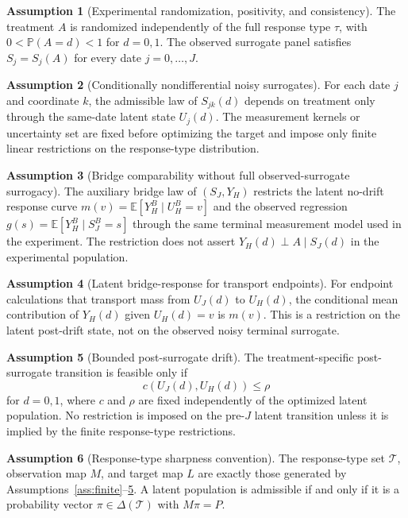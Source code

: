 \documentclass[11pt]{article}
\newcommand{\E}{\mathbb{E}}
\renewcommand{\Pr}{\mathbb{P}}
\theoremstyle{definition}
\newtheorem{assumption}{Assumption}
\theoremstyle{plain}
\theoremstyle{remark}
\begin{document}
\begin{assumption}[Experimental randomization, positivity, and consistency]\label{ass:randomization}
The treatment \(A\) is randomized independently of the full response type \(\tau\), with \(0<\Pr(A=d)<1\) for \(d=0,1\).  The observed surrogate panel satisfies \(S_j=S_j(A)\) for every date \(j=0,\ldots,J\).
\end{assumption}

\begin{assumption}[Conditionally nondifferential noisy surrogates]\label{ass:noisy-measurement}
For each date \(j\) and coordinate \(k\), the admissible law of \(S_{jk}(d)\) depends on treatment only through the same-date latent state \(U_j(d)\).  The measurement kernels or uncertainty set are fixed before optimizing the target and impose only finite linear restrictions on the response-type distribution.
\end{assumption}

\begin{assumption}[Bridge comparability without full observed-surrogate surrogacy]\label{ass:bridge}
The auxiliary bridge law of \((S_J,Y_H)\) restricts the latent no-drift response curve \(m(v)=\E[Y_H^B\mid U_H^B=v]\) and the observed regression \(g(s)=\E[Y_H^B\mid S_J^B=s]\) through the same terminal measurement model used in the experiment.  The restriction does not assert \(Y_H(d)\perp A\mid S_J(d)\) in the experimental population.
\end{assumption}

\begin{assumption}[Latent bridge-response for transport endpoints]\label{ass:bridge-response}
For endpoint calculations that transport mass from \(U_J(d)\) to \(U_H(d)\), the conditional mean contribution of \(Y_H(d)\) given \(U_H(d)=v\) is \(m(v)\).  This is a restriction on the latent post-drift state, not on the observed noisy terminal surrogate.
\end{assumption}

\begin{assumption}[Bounded post-surrogate drift]\label{ass:drift}
The treatment-specific post-surrogate transition is feasible only if
\[
  c(U_J(d),U_H(d))\le\rho
\]
for \(d=0,1\), where \(c\) and \(\rho\) are fixed independently of the optimized latent population.  No restriction is imposed on the pre-\(J\) latent transition unless it is implied by the finite response-type restrictions.
\end{assumption}

\begin{assumption}[Response-type sharpness convention]\label{ass:response-types}
The response-type set \(\mathcal T\), observation map \(M\), and target map \(L\) are exactly those generated by Assumptions~\ref{ass:finite}--\ref{ass:drift}.  A latent population is admissible if and only if it is a probability vector \(\pi\in\Delta(\mathcal T)\) with \(M\pi=P\).
\end{assumption}
\end{document}
